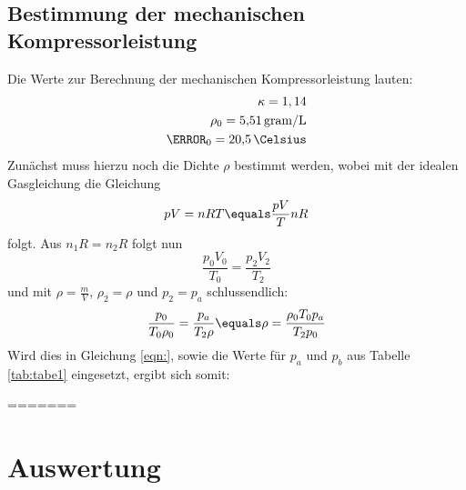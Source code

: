 \subsection{Bestimmung der mechanischen Kompressorleistung}
Die Werte zur Berechnung der mechanischen Kompressorleistung lauten:
\begin{align*}
  \kappa = 1,14 \\
  \rho_0 = \SI{5.51}{gram\per\liter} \\
  \T_0 = \SI{20.5}{\Celsius}
\end{align*}
Zunächst muss hierzu noch die Dichte $\rho$ bestimmt werden, wobei mit der idealen Gasgleichung
die Gleichung
\begin{equation}
  pV =nRT \equals \frac{pV}{T}{nR}
\end{equation}
folgt. Aus $n_1R =n_2R$ folgt nun
\begin{equation}
  \frac{p_0 V_0}{T_0} = \frac{p_2 V_2}{T_2}
\end{equation}
und mit $\rho = \frac{m}{V}$, $\rho_2=\rho$ und $p_2 =p_a$ schlussendlich:
\begin{equation}
  \frac{p_0}{T_0\rho_0} = \frac{p_a}{T_2 \rho} \equals \rho = \frac{\rho_0 T_0 p_a}{T_2p_0}
\end{equation}
Wird dies in Gleichung \ref{eqn:}, sowie die Werte für $p_a$ und $p_b$ aus Tabelle
\ref{tab:tabe1} eingesetzt, ergibt sich somit:

=======
\section{Auswertung}
\label{sec:Auswertung}
